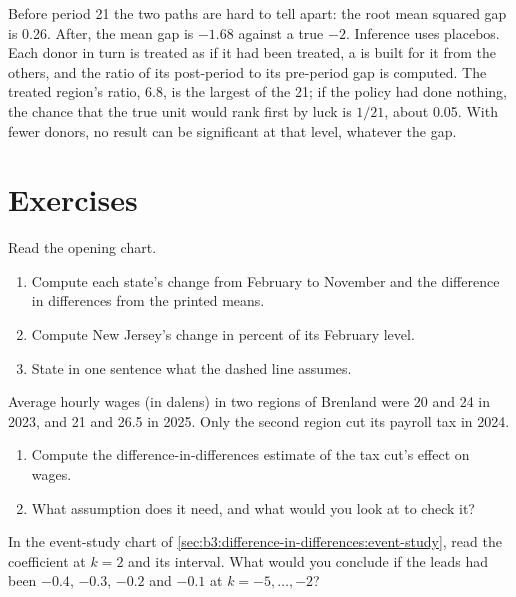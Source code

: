 Before period 21 the two paths are hard to tell apart: the root mean squared
gap is 0.26. After, the mean gap is $-1.68$ against a true $-2$. %
Inference uses placebos. Each donor in turn is treated as if it had been
treated, a  is built for it from the others, and the ratio of
its post-period to its pre-period gap is computed. The treated region's ratio,
6.8, is the largest of the 21; %
if the policy had done nothing, the chance that the true unit would rank first
by luck is $1/21$, about 0.05. With fewer donors, no result can be significant
at that level, whatever the gap.

\section{Exercises}\label{sec:b3:difference-in-differences:exercises}

\begin{exercise}[$\star$]\label{exo:b3:difference-in-differences:1}
Read the opening chart.
\begin{enumerate}
\item Compute each state's change from February to November and the
difference in differences from the printed means.
\item Compute New Jersey's change in percent of its February level.
\item State in one sentence what the dashed line assumes.
\end{enumerate}
\end{exercise}

\begin{exercise}[$\star$]\label{exo:b3:difference-in-differences:2}
Average hourly wages (in dalens) in two regions of Brenland were 20 and 24 in
2023, and 21 and 26.5 in 2025. Only the second region cut its payroll tax in
2024.
\begin{enumerate}
\item Compute the difference-in-differences estimate of the tax cut's effect on
wages.
\item What assumption does it need, and what would you look at to check it?
\end{enumerate}
\end{exercise}

\begin{exercise}[$\star$]\label{exo:b3:difference-in-differences:3}
In the event-study chart of \cref{sec:b3:difference-in-differences:event-study},
read the coefficient at $k = 2$ and its interval. What would you conclude if the
leads had been $-0.4$, $-0.3$, $-0.2$ and $-0.1$ at $k = -5, \dots, -2$?
\end{exercise}


